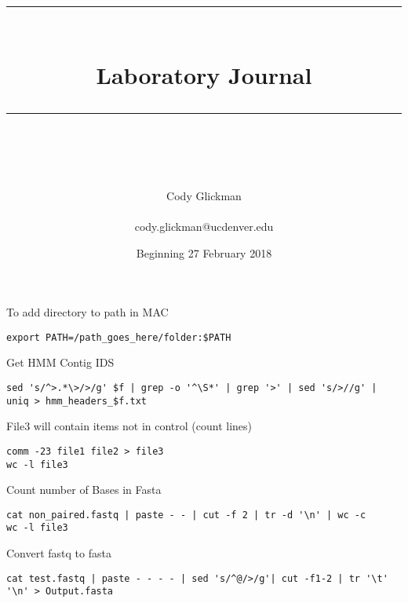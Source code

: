 \documentclass[idxtotoc,hyperref,openany,oneside]{labbook} %
\newcommand{\HRule}{\rule{\linewidth}{0.5mm}} %
\begin{document}

\frontmatter %
\title{
\begin{center}
\HRule \\[0.4cm]
{\Huge \bfseries Laboratory Journal \\[0.5cm] \Large} %
\HRule \\[1.5cm]
\end{center}
}
\author{\Huge Cody Glickman \\ \\ \LARGE cody.glickman@ucdenver.edu \\[2cm]} %
\date{Beginning 27 February 2018} %
\maketitle

\tableofcontents

\mainmatter %


To add directory to path in MAC
\begin{verbatim}
export PATH=/path_goes_here/folder:$PATH
\end{verbatim}

Get HMM Contig IDS
\begin{verbatim}
sed 's/^>.*\>/>/g' $f | grep -o '^\S*' | grep '>' | sed 's/>//g' | uniq > hmm_headers_$f.txt
\end{verbatim}


File3 will contain items not in control (count lines)
\begin{verbatim}
comm -23 file1 file2 > file3
wc -l file3
\end{verbatim}

Count number of Bases in Fasta
\begin{verbatim}
cat non_paired.fastq | paste - - | cut -f 2 | tr -d '\n' | wc -c 
wc -l file3
\end{verbatim}

Convert fastq to fasta
\begin{verbatim}
cat test.fastq | paste - - - - | sed 's/^@/>/g'| cut -f1-2 | tr '\t' '\n' > Output.fasta
\end{verbatim}
\end{document}
